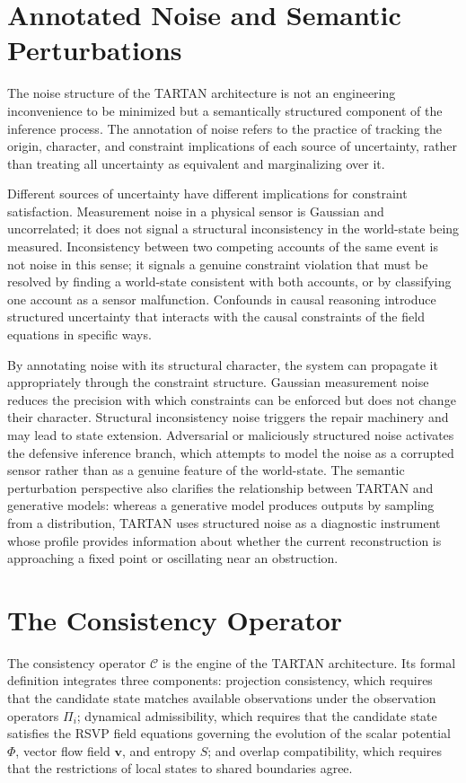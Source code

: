 \documentclass[11pt, oneside]{article}
\begin{document}
\section{Annotated Noise and Semantic Perturbations}

The noise structure of the TARTAN architecture is not an engineering inconvenience to be minimized but a semantically structured component of the inference process. The annotation of noise refers to the practice of tracking the origin, character, and constraint implications of each source of uncertainty, rather than treating all uncertainty as equivalent and marginalizing over it.

Different sources of uncertainty have different implications for constraint satisfaction. Measurement noise in a physical sensor is Gaussian and uncorrelated; it does not signal a structural inconsistency in the world-state being measured. Inconsistency between two competing accounts of the same event is not noise in this sense; it signals a genuine constraint violation that must be resolved by finding a world-state consistent with both accounts, or by classifying one account as a sensor malfunction. Confounds in causal reasoning introduce structured uncertainty that interacts with the causal constraints of the field equations in specific ways.

By annotating noise with its structural character, the system can propagate it appropriately through the constraint structure. Gaussian measurement noise reduces the precision with which constraints can be enforced but does not change their character. Structural inconsistency noise triggers the repair machinery and may lead to state extension. Adversarial or maliciously structured noise activates the defensive inference branch, which attempts to model the noise as a corrupted sensor rather than as a genuine feature of the world-state. The semantic perturbation perspective also clarifies the relationship between TARTAN and generative models: whereas a generative model produces outputs by sampling from a distribution, TARTAN uses structured noise as a diagnostic instrument whose profile provides information about whether the current reconstruction is approaching a fixed point or oscillating near an obstruction.

\section{The Consistency Operator}

The consistency operator $\mathcal{C}$ is the engine of the TARTAN architecture. Its formal definition integrates three components: projection consistency, which requires that the candidate state matches available observations under the observation operators $\Pi_i$; dynamical admissibility, which requires that the candidate state satisfies the RSVP field equations governing the evolution of the scalar potential $\Phi$, vector flow field $\mathbf{v}$, and entropy $S$; and overlap compatibility, which requires that the restrictions of local states to shared boundaries agree.
\end{document}
